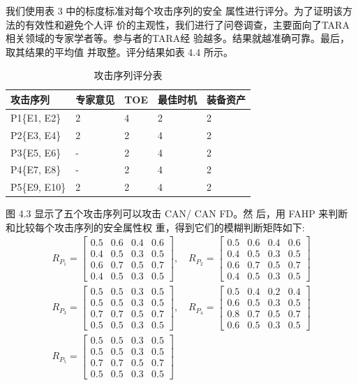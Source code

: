 我们使用表 3 中的标度标准对每个攻击序列的安全
属性进行评分。为了证明该方法的有效性和避免个人评
价的主观性，我们进行了问卷调查，主要面向了TARA相关领域的专家学者等。参与者的TARA经
验越多。结果就越准确可靠。最后，取其结果的平均值
并取整。评分结果如表 4.4 所示。
\begin{table}
  \caption{攻击序列评分表}
\begin{center}
  \begin{tabular}{|l|l|l|l|l|}
    \hline 攻击序列 &专家意见&TOE&最佳时机&装备资产\\
    \hline P1\{E1, E2\} & 2  &4 & 2 & 2 \\
    \hline P2\{E3, E4\} & 2  &2 & 4 & 2 \\
    \hline P3\{E5, E6\} & - & 2 & 4 & 2 \\
    \hline P4\{E7, E8\}  & -  & 2  & 4 & 2 \\
    \hline P5\{E9, E10\}  & 2  & 2  & 4 & 2 \\
    \hline
  \end{tabular}
\end{center}
\end{table}
图 4.3 显示了五个攻击序列可以攻击 CAN/ CAN FD。然
后，用 FAHP 来判断和比较每个攻击序列的安全属性权
重，得到它们的模糊判断矩阵如下:
$$
\begin{gathered}
R_{P_1}=\left[\begin{array}{llll}
0.5 & 0.6 & 0.4 & 0.6 \\
0.4 & 0.5 & 0.3 & 0.5 \\
0.6 & 0.7 & 0.5 & 0.7 \\
0.4 & 0.5 & 0.3 & 0.5
\end{array}\right], \quad R_{P_2}=\left[\begin{array}{llll}
0.5 & 0.6 & 0.4 & 0.6 \\
0.4 & 0.5 & 0.3 & 0.5 \\
0.6 & 0.7 & 0.5 & 0.7 \\
0.4 & 0.5 & 0.3 & 0.5
\end{array}\right] \\
R_{P_3}=\left[\begin{array}{llll}
0.5 & 0.5 & 0.3 & 0.5 \\
0.5 & 0.5 & 0.3 & 0.5 \\
0.7 & 0.7 & 0.5 & 0.7 \\
0.5 & 0.5 & 0.3 & 0.5
\end{array}\right], \quad R_{P_4}=\left[\begin{array}{llll}
0.5 & 0.4 & 0.2 & 0.4 \\
0.6 & 0.5 & 0.3 & 0.5 \\
0.8 & 0.7 & 0.5 & 0.7 \\
0.6 & 0.5 & 0.3 & 0.5
\end{array}\right] \\
R_{P_5}=\left[\begin{array}{llll}
0.5 & 0.5 & 0.3 & 0.5 \\
0.5 & 0.5 & 0.3 & 0.5 \\
0.7 & 0.7 & 0.5 & 0.7 \\
0.5 & 0.5 & 0.3 & 0.5
\end{array}\right]
\end{gathered}
$$

